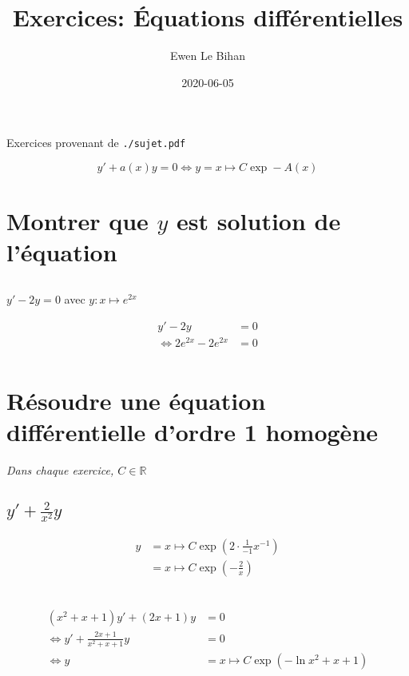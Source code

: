 \documentclass{article}
\title{Exercices: Équations différentielles}
\author{Ewen Le Bihan}
\date{2020-06-05}
\newcommand{\R}{\mathds{R}}
\begin{document}
\maketitle

\abstract{}
Exercices provenant de \texttt{./sujet.pdf}

\[
	y' + a(x)y = 0 \iff y = x \mapsto C \exp -A(x)
\] 


\section{Montrer que $y$ est solution de l'équation}
\subsection{}

$y'-2y=0$ avec  $y:x\mapsto e^{2x}$

\begin{align*}
	y' - 2y &= 0 \\
	\iff 2e^{2x} - 2e^{2x} &= 0 \\
\end{align*}

\subsection{}

\section{Résoudre une équation différentielle d'ordre 1 homogène}

\emph{Dans chaque exercice, $C \in \R$} 

\subsection{$y'+\frac{2}{x^2}y$}

\begin{align*}
	y &= x \mapsto C\exp\left( {2\cdot \frac{1}{-1}x^{-1}} \right)  \\
	  &= x \mapsto C \exp\left( -\frac{2}{x} \right)  \\
\end{align*}

\subsection{}

\begin{align*}
	(x^2 + x+1)y' + (2x+1)y &= 0 \\
	\iff y' + \frac{2x+1}{x^2+x+1}y &= 0 \\
	\iff y &= x \mapsto C \exp(-\ln x^2+x+1) \\
\end{align*}
\end{document}
